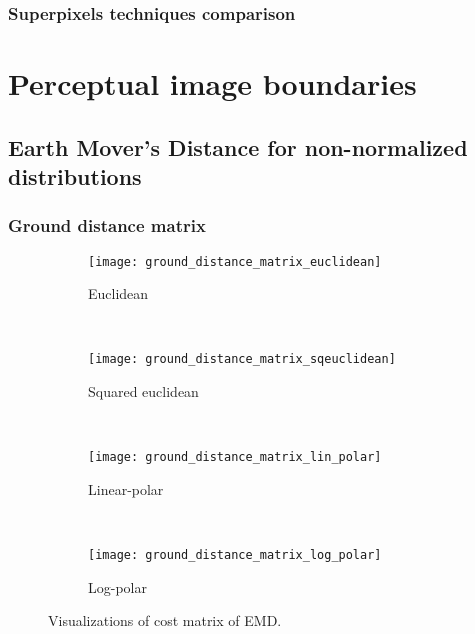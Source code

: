 \subsubsection{Superpixels techniques comparison}

\section{Perceptual image boundaries}
\subsection{Earth Mover's Distance for non-normalized distributions}

\subsubsection{Ground distance matrix}


\begin{figure}[!ht]
    \centering
    \begin{subfigure}[b]{0.47\textwidth}
		\texttt{[image: ground\_distance\_matrix\_euclidean]}	
		\caption{Euclidean}
        \label{fig:ground_distance_matrix_euclidean}
	\end{subfigure}
	~ %
    \begin{subfigure}[b]{0.47\textwidth}
		\texttt{[image: ground\_distance\_matrix\_sqeuclidean]}	
		\caption{Squared euclidean}
        \label{fig:ground_distance_matrix_sqeuclidean}
	\end{subfigure} \\[2ex]
    
    \begin{subfigure}[b]{0.47\textwidth}
		\texttt{[image: ground\_distance\_matrix\_lin\_polar]}	
		\caption{Linear-polar}
        \label{fig:ground_distance_matrix_lin_polarc}
	\end{subfigure}  
	~ %
	\begin{subfigure}[b]{0.47\textwidth}
		\texttt{[image: ground\_distance\_matrix\_log\_polar]}	
		\caption{Log-polar}
        \label{fig:ground_distance_matrix_log_polar}
	\end{subfigure}  
	   
   \caption{Visualizations of cost matrix of EMD.}
   \label{fig:EMD_ground_distance_matrix}
\end{figure}

